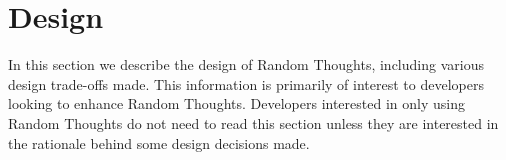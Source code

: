 
\chapter{Design}
\label{chapt:design}

In this section we describe the design of Random Thoughts, including various design trade-offs
made. This information is primarily of interest to developers looking to enhance Random
Thoughts. Developers interested in only using Random Thoughts do not need to read this section
unless they are interested in the rationale behind some design decisions made.

